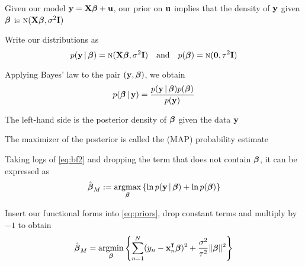 \begin{frame}
     
    \vspace{2em}
    Given our model ${\mathbf y} = \mathbf X {\boldsymbol \beta} + {\mathbf u}$, our
    prior on ${\mathbf u}$ implies that the density of ${\mathbf y}$ given ${\boldsymbol \beta}$ is
    $\textrm{\sc n}(\mathbf X {\boldsymbol \beta}, \sigma^2 \mathbf I)$
    
    Write our
    distributions as
    \begin{equation}
        \label{eq:priors}
        p({\mathbf y} \, | \, {\boldsymbol \beta}) = \textrm{\sc n}(\mathbf X {\boldsymbol \beta}, \sigma^2 \mathbf I)
        \quad \text{and} \quad
        p({\boldsymbol \beta}) = \textrm{\sc n}({\mathbf 0}, \tau^2 \mathbf I)
    \end{equation}
    
    \vspace{.7em}
    Applying Bayes' law to the pair $({\mathbf y}, {\boldsymbol \beta})$, we obtain
    \begin{equation}
        \label{eq:bf2}
        p({\boldsymbol \beta} \, | \, {\mathbf y}) 
            = \frac{p({\mathbf y} \, | \, {\boldsymbol \beta}) p({\boldsymbol \beta})}{p({\mathbf y})}
    \end{equation}
    
    \vspace{.7em}
    The left-hand side is the posterior density of ${\boldsymbol \beta}$ given
    the data ${\mathbf y}$
    
\end{frame}

\begin{frame}
    
    \vspace{2em}
    The maximizer of the posterior is called
    the  (MAP) probability estimate
    
    Taking logs of
    \eqref{eq:bf2} and dropping the term that does not contain ${\boldsymbol \beta}$, it 
    can be expressed as
    \begin{equation}
        \label{eq:betamap0}
        \hboldbeta_{M} := \argmax_{\boldbeta} 
        \left\{ \ln p(\boldy \given \boldbeta) + \ln p(\boldbeta) \right\}
    \end{equation}
    
    \vspace{.7em}
    Insert our functional forms into \eqref{eq:priors}, drop constant terms
    and multiply by $-1$ to obtain
    \begin{equation}
        \label{eq:betamap}
        \hboldbeta_{M} = \argmin_{\boldbeta} 
        \left\{ 
         \sum_{n=1}^N (y_n - \boldx_n^\T \boldbeta)^2 
        + \frac{\sigma^2}{\tau^2} \| \boldbeta \|^2 
        \right\}
    \end{equation}
    
\end{frame}

